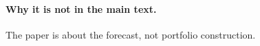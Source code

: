 \paragraph{Why it is not in the main text.} The paper is about the forecast,
not portfolio construction.

